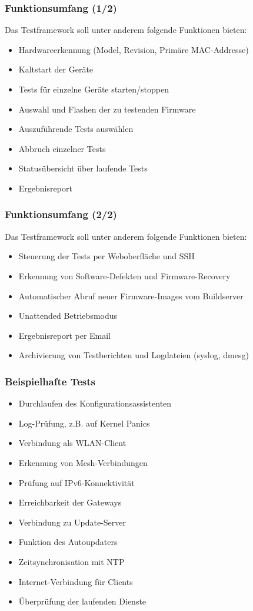 \documentclass[accentcolor=tud6b,colorbacktitle,inverttitle,landscape,german,presentation,t]{tudbeamer}
\begin{document}
	\begin{frame}
		\frametitle{Funktionsumfang (1/2)}
		\vfill
		Das Testframework soll unter anderem folgende Funktionen bieten:
		\vfill
		\begin{itemize}
			\item Hardwareerkennung (Model, Revision, Primäre MAC-Addresse)
			\item Kaltstart der Geräte
			\item Tests für einzelne Geräte starten/stoppen
			\item Auswahl und Flashen der zu testenden Firmware
			\item Auszuführende Tests auswählen
			\item Abbruch einzelner Tests
			\item Statusübersicht über laufende Tests
			\item Ergebnisreport
		\end{itemize}	
	\end{frame}
	
	\begin{frame}
		\frametitle{Funktionsumfang (2/2)}
		\vfill
		Das Testframework soll unter anderem folgende Funktionen bieten:
		\vfill
		\begin{itemize}
			\item Steuerung der Tests per Weboberfläche und SSH
			\item Erkennung von Software-Defekten und Firmware-Recovery
			\item Automatischer Abruf neuer Firmware-Images vom Buildserver
			\item Unattended Betriebsmodus
			\item Ergebnisreport per Email
			\item Archivierung von Testberichten und Logdateien (syslog, dmesg)
		\end{itemize}	
	\end{frame}
	\begin{frame}
		\frametitle{Beispielhafte Tests}
		\begin{itemize}
		    \item Durchlaufen des Konfigurationsassistenten
		    \item Log-Prüfung, z.B. auf Kernel Panics
		    \item Verbindung als WLAN-Client
		    \item Erkennung von Mesh-Verbindungen
		    \item Prüfung auf IPv6-Konnektivität
		    \item Erreichbarkeit der Gateways
		    \item Verbindung zu Update-Server
		    \item Funktion des Autoupdaters
		    \item Zeitsynchronisation mit NTP
		    \item Internet-Verbindung für Clients
		    \item Überprüfung der laufenden Dienste
 		\end{itemize}
	\end{frame}
\end{document}
